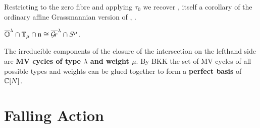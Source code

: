 \documentclass[draft]{article}
\begin{document}
Restricting to the zero fibre and applying $\tau_0$ we recover \cite[a main result]{dthesis}, itself a corollary of the ordinary affine Grassmannian version of , \cite[Theorem~4.4.1(c)]{mirkovic2019comparison}. 
% 
\begin{corollary}
    \label{cor:mvy}
    $\overline{\mathbb O}^\lambda \cap \mathbb T_\mu\cap\mathfrak n \cong\overline{\mathcal{G}\!r}^\lambda\cap S^\mu$. 
\end{corollary}
The irreducible components of the closure of the intersection on the lefthand side are \textbf{MV cycles of type $\lambda$ and weight $\mu$}. By BKK the set of MV cycles of all possible types and weights can be glued together to form a \textbf{perfect basis} of $\mathbb C[N]$. 


\section{Falling Action} %
\end{document}
